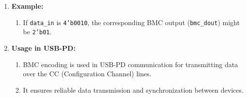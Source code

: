 \begin{enumerate}
    \item \textbf{Example:}
    \begin{enumerate}
        \item If \texttt{data\_in} is \texttt{4'b0010}, the corresponding BMC output (\texttt{bmc\_dout}) might be \texttt{2'b01}.
    \end{enumerate}

    \item \textbf{Usage in USB-PD:}
    \begin{enumerate}
        \item BMC encoding is used in USB-PD communication for transmitting data over the CC (Configuration Channel) lines.
        \item It ensures reliable data transmission and synchronization between devices.
    \end{enumerate}
\end{enumerate}

